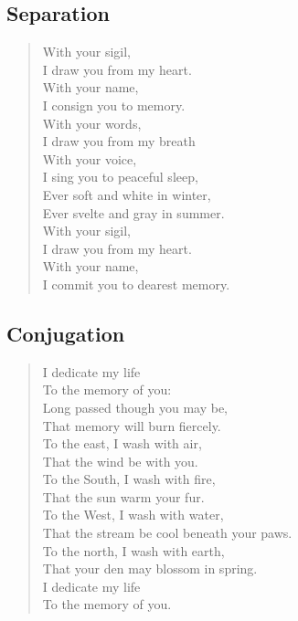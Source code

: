 \subsection{Separation}

\begin{verse}
With your sigil,\\
\vin I draw you from my heart.\\
With your name,\\
\vin I consign you to memory.\\
With your words,\\
\vin I draw you from my breath\\
With your voice,\\
\vin I sing you to peaceful sleep,\\
Ever soft and white in winter,\\
\vin Ever svelte and gray in summer.\\
With your sigil,\\
\vin I draw you from my heart.\\
With your name,\\
\vin I commit you to dearest memory.\\
\end{verse}
\newpage

\subsection{Conjugation}

\begin{verse}
I dedicate my life\\
\vin To the memory of you:\\
Long passed though you may be,\\
\vin That memory will burn fiercely.\\
To the east, I wash with air,\\
\vin That the wind be with you.\\
To the South, I wash with fire,\\
\vin That the sun warm your fur.\\
To the West, I wash with water,\\
\vin That the stream be cool beneath your paws.\\
To the north, I wash with earth,\\
\vin That your den may blossom in spring.\\
I dedicate my life\\
\vin To the memory of you.\\
\end{verse}
\newpage

